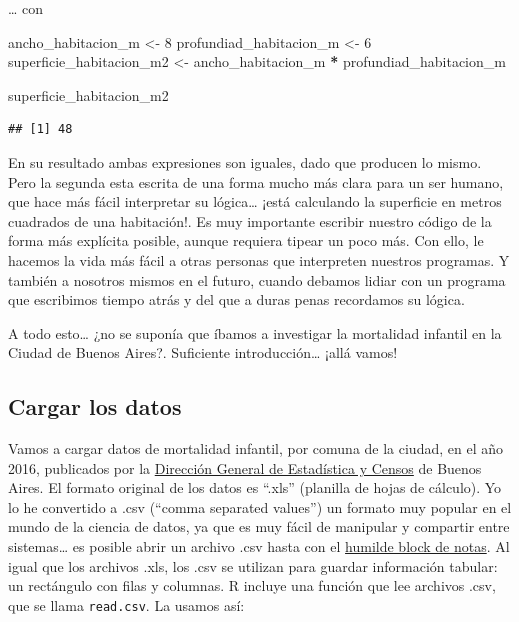 \documentclass[]{book}
\newenvironment{Shaded}{\begin{snugshade}}{\end{snugshade}}
\newcommand{\DecValTok}[1]{\textcolor[rgb]{0.00,0.00,0.81}{#1}}
\newcommand{\StringTok}[1]{\textcolor[rgb]{0.31,0.60,0.02}{#1}}
\newcommand{\OperatorTok}[1]{\textcolor[rgb]{0.81,0.36,0.00}{\textbf{#1}}}
\newcommand{\NormalTok}[1]{#1}
\begin{document}
\ldots{} con

\begin{Shaded}
\begin{Highlighting}[]
\NormalTok{ancho_habitacion_m <-}\StringTok{ }\DecValTok{8}
\NormalTok{profundiad_habitacion_m <-}\StringTok{ }\DecValTok{6}
\NormalTok{superficie_habitacion_m2 <-}\StringTok{ }\NormalTok{ancho_habitacion_m }\OperatorTok{*}\StringTok{ }\NormalTok{profundiad_habitacion_m}

\NormalTok{superficie_habitacion_m2}
\end{Highlighting}
\end{Shaded}

\begin{verbatim}
## [1] 48
\end{verbatim}

En su resultado ambas expresiones son iguales, dado que producen lo
mismo. Pero la segunda esta escrita de una forma mucho más clara para un
ser humano, que hace más fácil interpretar su lógica\ldots{} ¡está
calculando la superficie en metros cuadrados de una habitación!. Es muy
importante escribir nuestro código de la forma más explícita posible,
aunque requiera tipear un poco más. Con ello, le hacemos la vida más
fácil a otras personas que interpreten nuestros programas. Y también a
nosotros mismos en el futuro, cuando debamos lidiar con un programa que
escribimos tiempo atrás y del que a duras penas recordamos su lógica.

A todo esto\ldots{} ¿no se suponía que íbamos a investigar la mortalidad
infantil en la Ciudad de Buenos Aires?. Suficiente introducción\ldots{}
¡allá vamos!

\subsection{Cargar los datos}\label{cargar-los-datos}

Vamos a cargar datos de mortalidad infantil, por comuna de la ciudad, en
el año 2016, publicados por la
\href{http://www.estadisticaciudad.gob.ar/eyc/?p=67358}{Dirección
General de Estadística y Censos} de Buenos Aires. El formato original de
los datos es ``.xls'' (planilla de hojas de cálculo). Yo lo he
convertido a .csv (``comma separated values'') un formato muy popular en
el mundo de la ciencia de datos, ya que es muy fácil de manipular y
compartir entre sistemas\ldots{} es posible abrir un archivo .csv hasta
con el \href{https://es.wikipedia.org/wiki/Bloc_de_notas}{humilde block
de notas}. Al igual que los archivos .xls, los .csv se utilizan para
guardar información tabular: un rectángulo con filas y columnas. R
incluye una función que lee archivos .csv, que se llama
\texttt{read.csv}. La usamos así:
\end{document}
